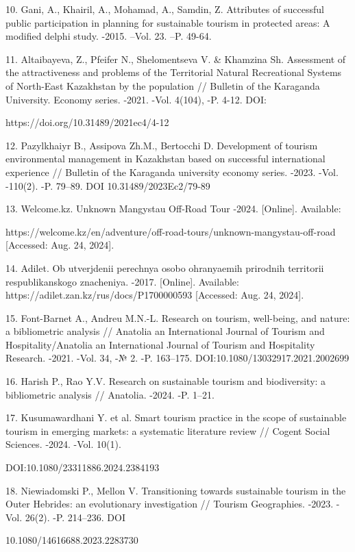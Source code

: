 \begin{noparindent}
10.
  Gani, A., Khairil, A., Mohamad, A., Samdin, Z. Attributes of
  successful public participation in planning for sustainable tourism in
  protected areas: A modified delphi study. -2015. --Vol. 23. --P.
  49-64.

11.
  Altaibayeva, Z., Pfeifer N., Shelomentseva V. \& Khamzina Sh.
  Assessment of the attractiveness and problems of the Territorial
  Natural Recreational Systems of North-East Kazakhstan by the
  population // Bulletin of the Karaganda University. Economy series.
  -2021. -Vol. 4(104), -P. 4-12. DOI:
  
  https://doi.org/10.31489/2021ec4/4-12

12.
  Pazylkhaiyr B., Assipova Zh.M., Bertocchi D. Development of tourism
  environmental management in Kazakhstan based on successful
  international experience // Bulletin of the Karaganda university
  economy series. -2023. -Vol. -110(2). -P. 79--89. DOI
  10.31489/2023Ec2/79-89

13.
  Welcome.kz. Unknown Mangystau Off-Road Tour -2024. {[}Online{]}.
  Available:
  
  https://welcome.kz/en/adventure/off-road-tours/unknown-mangystau-off-road
  {[}Accessed: Aug. 24, 2024{]}.

14.
  Adilet. Ob utverjdenii perechnya osobo ohranyaemih prirodnih
  territorii respublikanskogo znacheniya. -2017. {[}Online{]}.
  Available: https://adilet.zan.kz/rus/docs/P1700000593 {[}Accessed:
  Aug. 24, 2024{]}.

15.
  Font-Barnet A., Andreu M.N.-L. Research on tourism, well-being, and
  nature: a bibliometric analysis // Anatolia an International Journal
  of Tourism and Hospitality/Anatolia an International Journal of
  Tourism and Hospitality Research. -2021. -Vol. 34, -№ 2. -P. 163--175.
  DOI:10.1080/13032917.2021.2002699

16.
  Harish P., Rao Y.V. Research on sustainable tourism and biodiversity:
  a bibliometric analysis // Anatolia. -2024. -P. 1--21.

17.
  Kusumawardhani Y. et al. Smart tourism practice in the scope of
  sustainable tourism in emerging markets: a systematic literature
  review // Cogent Social Sciences. -2024. -Vol. 10(1).

  DOI:10.1080/23311886.2024.2384193

18.
  Niewiadomski P., Mellon V. Transitioning towards sustainable tourism
  in the Outer Hebrides: an evolutionary investigation // Tourism
  Geographies. -2023. -Vol. 26(2). -P. 214--236. DOI

  10.1080/14616688.2023.2283730
\end{noparindent}

